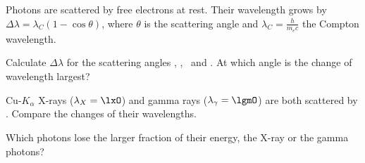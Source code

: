 Photons are scattered by free electrons at rest. Their wavelength grows by $\Delta\lambda = \lambda_C\left(1-\cos\theta\right)$, where $\theta$ is the scattering angle and $\lambda_C = \frac{h}{m_e c}$ the Compton wavelength.

\begin{abcliste}
\abc Calculate $\Delta\lambda$ for the scattering angles \angaO, \angbO, \angcO\ and \angdO. At which angle is the change of wavelength largest?

\abc Cu-$K_\alpha$ X-rays ($\lambda_X = \lxO$) and gamma rays ($\lambda_\gamma = \lgmO$) are both scattered by \angcO. Compare the changes of their wavelengths.

\abc Which photons lose the larger fraction of their energy, the X-ray or the gamma photons?
\end{abcliste}
